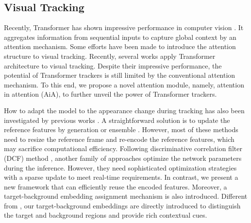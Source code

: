 \documentclass[runningheads]{llncs}
\begin{document}
\subsection{Visual Tracking}
Recently, Transformer \cite{vaswani2017attention} has shown impressive performance in computer vision \cite{carion2020end,zhu2020deformable,dosovitskiy2020image}. It aggregates information from sequential inputs to capture global context by an attention mechanism. Some efforts \cite{yu2020deformable,guo2021graph,fu2021stmtrack} have been made to introduce the attention structure to visual tracking. Recently, several works \cite{wang2021transformer,chen2021transformer,yu2021high,cao2021hift,yan2021learning,xing2022siamese} apply Transformer architecture to visual tracking. Despite their impressive performance, the potential of Transformer trackers is still limited by the conventional attention mechanism. To this end, we propose a novel attention module, namely, attention in attention (AiA), to further unveil the power of Transformer trackers.

How to adapt the model to the appearance change during tracking has also been investigated by previous works \cite{danelljan2019atom,bhat2019learning,zhang2019learning,dai2020high,bhat2020know,fu2021stmtrack,wang2021transformer,yan2021learning}. A straightforward solution is to update the reference features by generation \cite{zhang2019learning} or ensemble \cite{fu2021stmtrack,wang2021transformer,yan2021learning}. However, most of these methods need to resize the reference frame and re-encode the reference features, which may sacrifice computational efficiency. Following discriminative correlation filter (DCF) method \cite{henriques2014high}, another family of approaches \cite{danelljan2019atom,bhat2019learning} optimize the network parameters during the inference. However, they need sophisticated optimization strategies with a sparse update to meet real-time requirements. In contrast, we present a new framework that can efficiently reuse the encoded features. Moreover, a target-background embedding assignment mechanism is also introduced. Different from \cite{ge2021video,yang2021associating,lan2021siamese}, our target-background embeddings are directly introduced to distinguish the target and background regions and provide rich contextual cues.
\end{document}
